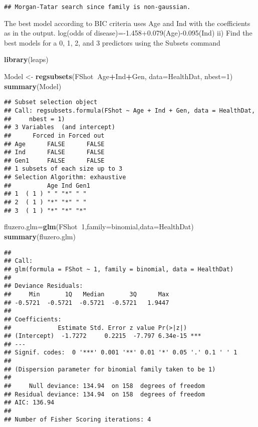 \documentclass[]{article}
\newenvironment{Shaded}{\begin{snugshade}}{\end{snugshade}}
\newcommand{\KeywordTok}[1]{\textcolor[rgb]{0.13,0.29,0.53}{\textbf{#1}}}
\newcommand{\DataTypeTok}[1]{\textcolor[rgb]{0.13,0.29,0.53}{#1}}
\newcommand{\DecValTok}[1]{\textcolor[rgb]{0.00,0.00,0.81}{#1}}
\newcommand{\StringTok}[1]{\textcolor[rgb]{0.31,0.60,0.02}{#1}}
\newcommand{\OperatorTok}[1]{\textcolor[rgb]{0.81,0.36,0.00}{\textbf{#1}}}
\newcommand{\NormalTok}[1]{#1}
\begin{document}
\begin{verbatim}
## Morgan-Tatar search since family is non-gaussian.
\end{verbatim}

The best model according to BIC criteria uses Age and Ind with the
coefficients as in the output. log(odds of
disease)=-1.458+0.079(Age)-0.095(Ind) ii) Find the best models for a 0,
1, 2, and 3 predictors using the Subsets command

\begin{Shaded}
\begin{Highlighting}[]
\KeywordTok{library}\NormalTok{(leaps)}

\NormalTok{Model <-}\StringTok{ }\KeywordTok{regsubsets}\NormalTok{(FShot}\OperatorTok{~}\NormalTok{Age}\OperatorTok{+}\NormalTok{Ind}\OperatorTok{+}\NormalTok{Gen, }\DataTypeTok{data=}\NormalTok{HealthDat, }\DataTypeTok{nbest=}\DecValTok{1}\NormalTok{)}
\KeywordTok{summary}\NormalTok{(Model)}
\end{Highlighting}
\end{Shaded}

\begin{verbatim}
## Subset selection object
## Call: regsubsets.formula(FShot ~ Age + Ind + Gen, data = HealthDat, 
##     nbest = 1)
## 3 Variables  (and intercept)
##      Forced in Forced out
## Age      FALSE      FALSE
## Ind      FALSE      FALSE
## Gen1     FALSE      FALSE
## 1 subsets of each size up to 3
## Selection Algorithm: exhaustive
##          Age Ind Gen1
## 1  ( 1 ) " " "*" " " 
## 2  ( 1 ) "*" "*" " " 
## 3  ( 1 ) "*" "*" "*"
\end{verbatim}

\begin{Shaded}
\begin{Highlighting}[]
\NormalTok{fluzero.glm=}\KeywordTok{glm}\NormalTok{(FShot}\OperatorTok{~}\DecValTok{1}\NormalTok{,}\DataTypeTok{family=}\NormalTok{binomial,}\DataTypeTok{data=}\NormalTok{HealthDat)}
\KeywordTok{summary}\NormalTok{(fluzero.glm)}
\end{Highlighting}
\end{Shaded}

\begin{verbatim}
## 
## Call:
## glm(formula = FShot ~ 1, family = binomial, data = HealthDat)
## 
## Deviance Residuals: 
##     Min       1Q   Median       3Q      Max  
## -0.5721  -0.5721  -0.5721  -0.5721   1.9447  
## 
## Coefficients:
##             Estimate Std. Error z value Pr(>|z|)    
## (Intercept)  -1.7272     0.2215  -7.797 6.34e-15 ***
## ---
## Signif. codes:  0 '***' 0.001 '**' 0.01 '*' 0.05 '.' 0.1 ' ' 1
## 
## (Dispersion parameter for binomial family taken to be 1)
## 
##     Null deviance: 134.94  on 158  degrees of freedom
## Residual deviance: 134.94  on 158  degrees of freedom
## AIC: 136.94
## 
## Number of Fisher Scoring iterations: 4
\end{verbatim}
\end{document}

